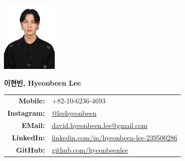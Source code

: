 \documentclass[a4paper,10pt]{extarticle}
\begin{document}
\pagestyle{empty}



\begin{minipage}{0.1\textwidth}
    \begin{flushleft}
        \includegraphics[height=3.5cm]{photo_231008.jpeg}
    \end{flushleft}
\end{minipage}
\hfill
\begin{minipage}{0.7\textwidth}
    \begin{flushright}
        \textbf{\Large 이현빈, Hyeonbeen Lee} %
        \newline\newline
        \begin{tabular}{rl}
            \textbf{Mobile: }    & +82-10-6236-4693                                                                                     \\
            \textbf{Instagram: } & \href{https://www.instagram.com/leehyeonbeen}{@leehyeonbeen}                                         \\
            \textbf{EMail: }     & \href{mailto:david.hyeonbeen.lee@gmail.com}{david.hyeonbeen.lee@gmail.com}                           \\
            \textbf{LinkedIn: }  & \href{https://www.linkedin.com/in/hyeonbeen-lee-239500286/}{linkedin.com/in/hyeonbeen-lee-239500286} \\
            \textbf{GitHub: }    & \href{https://github.com/hyeonbeenlee}{github.com/hyeonbeenlee}                                      \\
        \end{tabular}
    \end{flushright}

\end{minipage}
\end{document}
